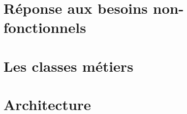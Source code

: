 \section{Réponse aux besoins non-fonctionnels}


\section{Les classes métiers}
\label{section_metiers}

\section{Architecture}

